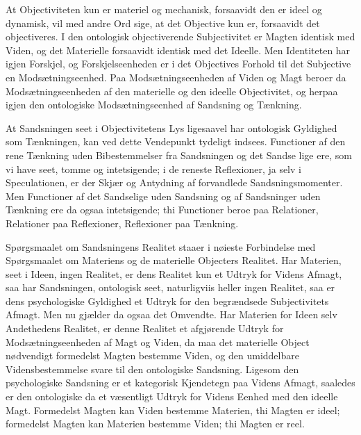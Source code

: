 \documentclass[12pt]{book}
\newcommand{\apage}[1]{\marginnote{\footnotesize\textit{[#1]}}}
\begin{document}
At Objectiviteten kun er materiel og mechanisk, forsaavidt den er ideel og dynamisk, vil med
andre Ord sige, at det Objective kun er, forsaavidt det objectiveres. I den ontologisk
objectiverende Subjectivitet er Magten identisk med Viden, og det Materielle forsaavidt identisk
med det Ideelle. Men Identiteten har igjen Forskjel, og Forskjelseenheden er i det Objectives
Forhold til det Subjective en Modsætningseenhed. Paa Modsætningseenheden af Viden og Magt beroer
da Modsætningseenheden af den materielle og den ideelle Objectivitet, og herpaa igjen den
ontologiske Modsætningseenhed af Sandsning og Tænkning.

At Sandsningen seet i Objectivitetens Lys ligesaavel har ontologisk Gyldighed som Tænkningen,
kan ved dette Vendepunkt tydeligt indsees. Functioner af den rene Tænkning uden Bibestemmelser
fra Sandsningen og det Sandse\-%
lige \apage{392} ere, som vi have seet, tomme og intetsigende; i de reneste Reflexioner, ja selv i
Speculationen, er der Skjær og Antydning af forvandlede Sandsningsmomenter. Men Functioner af
det Sandselige uden Sandsning og af Sandsninger uden Tænkning ere da ogsaa intetsigende; thi
Functioner beroe paa Relationer, Relationer paa Reflexioner, Reflexioner paa Tænkning.

Spørgsmaalet om Sandsningens Realitet staaer i nøieste Forbindelse med Spørgsmaalet om Materiens
og de materielle Objecters Realitet. Har Materien, seet i Ideen, ingen Realitet, er dens
Realitet kun et Udtryk for Videns Afmagt, saa har Sandsningen, ontologisk seet, naturligviis
heller ingen Realitet, saa er dens psychologiske Gyldighed et Udtryk for den begrændsede
Subjectivitets Afmagt. Men nu gjælder da ogsaa det Omvendte. Har Materien for Ideen selv
Andethedens Realitet, er denne Realitet et afgjørende Udtryk for Modsætningseenheden af Magt og
Viden, da maa det materielle Object nødvendigt formedelst Magten bestemme Viden, og den
umiddelbare Vidensbestemmelse svare til den ontologiske Sandsning. Ligesom den psychologiske
Sandsning er et kategorisk Kjendetegn paa Videns Afmagt, saaledes er den ontologiske da et
væsentligt Udtryk for Videns Eenhed med den ideelle Magt. Formedelst Magten kan Viden bestemme
Materien, thi Magten er ideel; formedelst Magten kan Materien bestemme Viden; thi Magten er reel.
\end{document}
